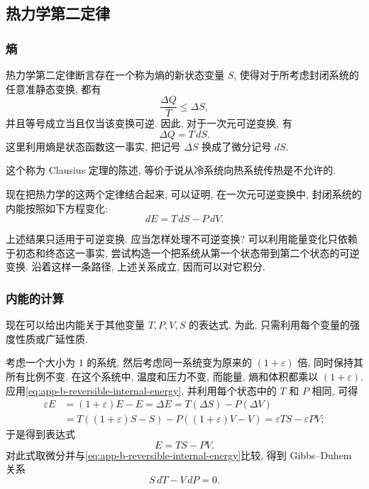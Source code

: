 \subsection{热力学第二定律}
\label{sec:app-b-second-law}
\renewcommand{\thestatement}{B.3.\arabic{statement}}
\renewcommand{\theHstatement}{appB.sec03.\arabic{statement}}
\setcounter{statement}{0}

\subsubsection{熵}
\label{subsec:app-b-entropy}

热力学第二定律断言存在一个称为熵的新状态变量 $S$, 使得对于所考虑封闭系统的任意准静态变换, 都有
\begin{equation}
 \frac{\Delta Q}{T}\leq\Delta S,
 \label{eq:app-b-clausius-inequality}
\end{equation}
并且等号成立当且仅当该变换可逆. 因此, 对于一次元可逆变换, 有
\[
 \Delta Q=T\,dS.
\]
这里利用熵是状态函数这一事实, 把记号 $\Delta S$ 换成了微分记号 $dS$.

这个称为 Clausius 定理的陈述, 等价于说从冷系统向热系统传热是不允许的.

现在把热力学的这两个定律结合起来, 可以证明, 在一次元可逆变换中, 封闭系统的内能按照如下方程变化:
\begin{equation}
 dE=T\,dS-P\,dV.
 \label{eq:app-b-reversible-internal-energy}
\end{equation}

\begin{Remark}
\label{rem:app-b-irreversible-transformations}
上述结果只适用于可逆变换. 应当怎样处理不可逆变换? 可以利用能量变化只依赖于初态和终态这一事实, 尝试构造一个把系统从第一个状态带到第二个状态的可逆变换. 沿着这样一条路径, 上述关系成立, 因而可以对它积分.
\end{Remark}

\subsubsection{内能的计算}
\label{subsec:app-b-internal-energy-calculation}

现在可以给出内能关于其他变量 $T,P,V,S$ 的表达式. 为此, 只需利用每个变量的强度性质或广延性质.

考虑一个大小为 $1$ 的系统, 然后考虑同一系统变为原来的 $(1+\varepsilon)$ 倍, 同时保持其所有比例不变. 在这个系统中, 温度和压力不变, 而能量, 熵和体积都乘以 $(1+\varepsilon)$. 应用\eqref{eq:app-b-reversible-internal-energy}, 并利用每个状态中的 $T$ 和 $P$ 相同, 可得
\[
\begin{aligned}
 \varepsilon E&=(1+\varepsilon)E-E=\Delta E=T(\Delta S)-P(\Delta V)\\
 &=T((1+\varepsilon)S-S)-P((1+\varepsilon)V-V)
 =\varepsilon TS-\varepsilon PV;
\end{aligned}
\]
于是得到表达式
\[
 E=TS-PV.
\]
对此式取微分并与\eqref{eq:app-b-reversible-internal-energy}比较, 得到 Gibbs--Duhem 关系
\begin{equation}
 S\,dT-V\,dP=0.
 \label{eq:app-b-gibbs-duhem}
\end{equation}
